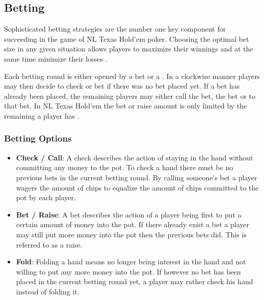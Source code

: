 \subsection{Betting}
Sophisticated betting strategies are the number one key component for succeeding in the game of NL Texas Hold'em poker. Choosing the optimal bet size in any given situation allows players to maximize their winnings and at the same time minimize their losses \cite{master_nuno}. \par
Each betting round is either opened by a bet or a . In a clockwise manner players may then decide to check or bet if there was no bet placed yet. If a bet has already been placed, the remaining players may either call the bet,  the bet or  to that bet. In NL Texas Hold'em the bet or raise amount is only limited by the remaining  a player has \cite{poker_dummies}. \par
\subsubsection{Betting Options \cite{review, poker_dummies}}
\begin{itemize}
\item \textbf{Check / Call}:
A check describes the action of staying in the hand without committing any money to the pot. To check a hand there must be no previous bets in the current betting round. By calling someone's bet a player wagers the amount of chips to equalize the amount of chips committed to the pot by each player.\\ 
\item \textbf{Bet / Raise}:
A bet describes the action of a player being first to put a certain amount of money into the pot. If there already exist a bet a player may still put more money into the pot then the previous bets did. This is referred to as a raise. \\ 
\item \textbf{Fold}:
Folding a hand means no longer being interest in the hand and not willing to put any more money into the pot. If however no bet has been placed in the current betting round yet, a player may rather check his hand instead of folding it.
\end{itemize}
